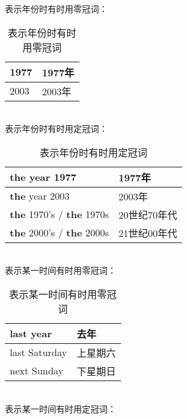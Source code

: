 \documentclass[UTF8]{ctexart}
\begin{document}
\newpage
    表示年份时有时用零冠词：
    \begin{table}[h!]
        \begin{center}
            \ttfamily
            \begin{tabular}{p{180pt}|p{100pt}}
                \hline
                1977&1977年\\ \hline
                2003&2003年\\ \hline
            \end{tabular}
            \rmfamily
            \caption{表示年份时有时用零冠词}
        \end{center}
    \end{table}\\
    表示年份时有时用定冠词：
    \begin{table}[h!]
        \begin{center}
            \ttfamily
            \begin{tabular}{p{180pt}|p{100pt}}
                \hline
                \textbf{the} year 1977&1977年\\ \hline
                \textbf{the} year 2003&2003年\\ \hline
                \textbf{the} 1970's / \textbf{the} 1970s&20世纪70年代\\ \hline
                \textbf{the} 2000's / \textbf{the} 2000s&21世纪00年代\\ \hline
            \end{tabular}
            \rmfamily
            \caption{表示年份时有时用定冠词}
        \end{center}
    \end{table}\\
    表示某一时间有时用零冠词：
    \begin{table}[h!]
        \begin{center}
            \ttfamily
            \begin{tabular}{p{180pt}|p{100pt}}
                \hline
                last year&去年\\ \hline
                last Saturday&上星期六\\ \hline
                next Sunday&下星期日\\ \hline
            \end{tabular}
            \rmfamily
            \caption{表示某一时间有时用零冠词}
        \end{center}
    \end{table}\\
    表示某一时间有时用定冠词：
\end{document}
